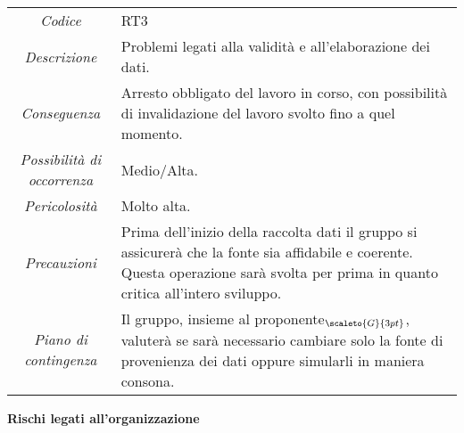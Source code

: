 {{{	\begin{center}
		\renewcommand{\arraystretch}{1.4}
		\begin{tabularx}{\textwidth}{|c|X|}
			\hline
			\rowcolor{airforceblue}
			\multicolumn{2}{|c|}{\textit{Validità dei dati}}\\
			\hline
			\textit{Codice} & RT3 \\
			\hline
			\textit{Descrizione} & Problemi legati alla validità e all'elaborazione dei dati. \\
			\hline
			\textit{Conseguenza} & Arresto obbligato del lavoro in corso, con possibilità di invalidazione del lavoro svolto fino a quel momento. \\
			\hline
			\textit{Possibilità di occorrenza} & Medio/Alta. \\
			\hline
			\textit{Pericolosità} & Molto alta. \\
			\hline
			\textit{Precauzioni} & Prima dell'inizio della raccolta dati il gruppo si assicurerà che la fonte sia affidabile e coerente.
			Questa operazione sarà svolta per prima in quanto critica all'intero sviluppo.  \\
			\hline
			\textit{Piano di contingenza} & Il gruppo, insieme al proponente$_{\scaleto{G}{3pt}}$, valuterà se sarà necessario cambiare solo la fonte di provenienza dei dati oppure simularli in maniera consona. \\
			\hline
		\end{tabularx}
	\end{center}

\quad
\begin{center}
	\LARGE\textbf{Rischi legati all'organizzazione}
\end{center}

\def\tabularxcolumn#1{m{#1}}
{

}}}}
